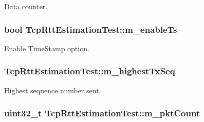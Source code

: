 Data counter. 

\subsubsection[{\texorpdfstring{m\+\_\+enable\+Ts}{m_enableTs}}]{\setlength{\rightskip}{0pt plus 5cm}bool Tcp\+Rtt\+Estimation\+Test\+::m\+\_\+enable\+Ts\hspace{0.3cm}{\ttfamily [private]}}\hypertarget{classTcpRttEstimationTest_a38fddc898bc183558475f0eff7f6ae1a}{}\label{classTcpRttEstimationTest_a38fddc898bc183558475f0eff7f6ae1a}


Enable Time\+Stamp option. 

\subsubsection[{\texorpdfstring{m\+\_\+highest\+Tx\+Seq}{m_highestTxSeq}}]{ Tcp\+Rtt\+Estimation\+Test\+::m\+\_\+highest\+Tx\+Seq\hspace{0.3cm}{\ttfamily [private]}}\hypertarget{classTcpRttEstimationTest_a3c08a5a07c9dc4c9c85c6d8fe4f7ca68}{}\label{classTcpRttEstimationTest_a3c08a5a07c9dc4c9c85c6d8fe4f7ca68}


Highest sequence number sent. 

\subsubsection[{\texorpdfstring{m\+\_\+pkt\+Count}{m_pktCount}}]{\setlength{\rightskip}{0pt plus 5cm}uint32\+\_\+t Tcp\+Rtt\+Estimation\+Test\+::m\+\_\+pkt\+Count\hspace{0.3cm}{\ttfamily [private]}}\hypertarget{classTcpRttEstimationTest_a4d52bd083094492d32dd4d57e77779ca}{}\label{classTcpRttEstimationTest_a4d52bd083094492d32dd4d57e77779ca}


